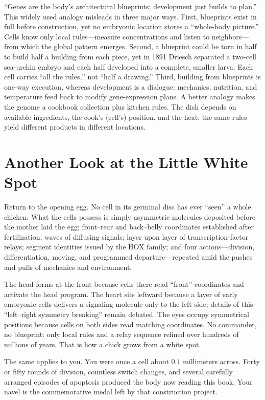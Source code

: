 \begin{wuqu}
``Genes are the body's architectural blueprints; development just builds to plan.'' This widely used analogy misleads in three major ways. First, blueprints exist in full before construction, yet no embryonic location stores a ``whole-body picture.'' Cells know only local rules---measure concentrations and listen to neighbors---from which the global pattern emerges. Second, a blueprint could be torn in half to build half a building from each piece, yet in 1891 Driesch separated a two-cell sea-urchin embryo and each half developed into a complete, smaller larva. Each cell carries ``all the rules,'' not ``half a drawing.'' Third, building from blueprints is one-way execution, whereas development is a dialogue: mechanics, nutrition, and temperature feed back to modify gene-expression plans. A better analogy makes the genome a cookbook collection plus kitchen rules. The dish depends on available ingredients, the cook's (cell's) position, and the heat: the same rules yield different products in different locations.
\end{wuqu}

\section{Another Look at the Little White Spot}

Return to the opening egg. No cell in its germinal disc has ever ``seen'' a whole chicken. What the cells possess is simply asymmetric molecules deposited before the mother laid the egg; front--rear and back--belly coordinates established after fertilization; waves of diffusing signals; layer upon layer of transcription-factor relays; segment identities issued by the HOX family; and four actions---division, differentiation, moving, and programmed departure---repeated amid the pushes and pulls of mechanics and environment.

The head forms at the front because cells there read ``front'' coordinates and activate the head program. The heart sits leftward because a layer of early embryonic cells delivers a signaling molecule only to the left side; details of this ``left--right symmetry breaking'' remain debated. The eyes occupy symmetrical positions because cells on both sides read matching coordinates. No commander, no blueprint: only local rules and a relay sequence refined over hundreds of millions of years. That is how a chick grows from a white spot.

The same applies to you. You were once a cell about $0.1$ millimeters across. Forty or fifty rounds of division, countless switch changes, and several carefully arranged episodes of apoptosis produced the body now reading this book. Your navel is the commemorative medal left by that construction project.

